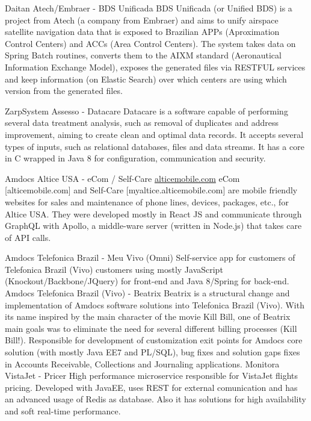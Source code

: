 \documentclass[]{friggeri-cv}
\begin{document}
\begin{entrylist}
 \entry
    {Daitan}
    {Atech/Embraer - BDS Unificada}
    {\href{}{}}
    {BDS Unificada (or Unified BDS) is a project from Atech (a company from Embraer) and aims to unify airspace satellite navigation data that is exposed to Brazilian APPs (Aproximation Control Centers) and ACCs (Area Control Centers). The system takes data on Spring Batch routines, converts them to the AIXM standard (Aeronautical Information Exchange Model), exposes the generated files via RESTFUL services and keep information (on Elastic Search) over which centers are using which version from the generated files.} 

\begin{comment}
 \entry
    {ZarpSystem}
    {OdontoPrev - Portal Parceiros}
    {\href{}{https://www.parceirosodontoprev.com.br}}
    {Parceiros is a website used by brokers of OdontoPrev (private dental care company) to sell its plans and manage commissioning. It uses basically Java 8/Spring Boot/Thymeleaf and REST communication, along with batch processes (Spring Batch). } 
\end{comment}

\entry
    {ZarpSystem}
    {Assesso - Datacare}
    {\href{}{}}
    {Datacare is a software capable of performing several data treatment analysis, such as removal of duplicates and address improvement, aiming to create clean and optimal data records. It accepts several types of inputs, such as relational databases, files and data streams. It has a core in C wrapped in Java 8 for configuration, communication and security.  } 
    
\entry
    {Amdocs}
    {Altice USA - eCom / Self-Care}
    {\href{eCom}{alticemobile.com}}
    {eCom [alticemobile.com] and Self-Care [myaltice.alticemobile.com] are mobile friendly websites for sales and maintenance of phone lines, devices, packages, etc., for Altice USA. They were developed mostly in React JS and communicate through GraphQL with Apollo, a middle-ware server (written in Node.js) that takes care of API calls.}

 \entry
    {Amdocs}
    {Telefonica Brazil - Meu Vivo (Omni)}
    {\href{}{}}
    {Self-service app for customers of Telefonica Brazil (Vivo) customers using mostly JavaScript (Knockout/Backbone/JQuery) for front-end and Java 8/Spring for back-end.} 
 \entry
    {Amdocs}
    {Telefonica Brazil (Vivo) - Beatrix}
    {\href{}{}}
    {Beatrix is a structural change and implementation of Amdocs software solutions into Telefonica Brazil (Vivo). With its name inspired by the main character of the movie Kill Bill, one of Beatrix main goals was to eliminate the need for several different billing processes (Kill Bill!). Responsible for development of customization exit points for Amdocs core solution (with mostly Java EE7 and PL/SQL), bug fixes and solution gaps fixes in Accounts Receivable, Collections and Journaling applications.}
 \entry
    {Monitora}
    {VistaJet - Pricer }
    {\href{}{}}
    {High performance microservice responsible for VistaJet flights pricing. Developed with JavaEE, uses REST for external comunication and has an advanced usage of Redis as database. Also it has solutions for high availability and soft real-time performance.}


\end{entrylist}
\end{document}
